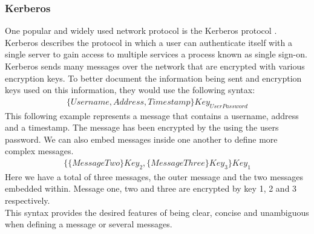 \subsubsection{Kerberos}
One popular and widely used network protocol is the Kerberos protocol \cite{steiner1988kerberos}. Kerberos describes the protocol in which a user can authenticate itself with a single server to gain access to multiple services a process known as single sign-on. Kerberos sends many messages over the network that are encrypted with various encryption keys. To better document the information being sent and encryption keys used on this information, they would use the following syntax:
$$
\begin{multlined}
 \{Username, Address, Timestamp\}Key_{UserPassword}
\end{multlined}
$$
This following example represents a message that contains a username, address and a timestamp. The message has been encrypted by the using the users password. We can also embed messages inside one another to define more complex messages.
$$
\begin{multlined}
 \{\{MessageTwo\}Key_{2}, \{MessageThree\}Key_{3}\}Key_1
\end{multlined}
$$
Here we have a total of three messages, the outer message and the two messages embedded within. Message one, two and three are encrypted by key 1, 2 and 3 respectively.
\\
This syntax provides the desired features of being clear, concise and unambiguous when defining  a message or several messages.

